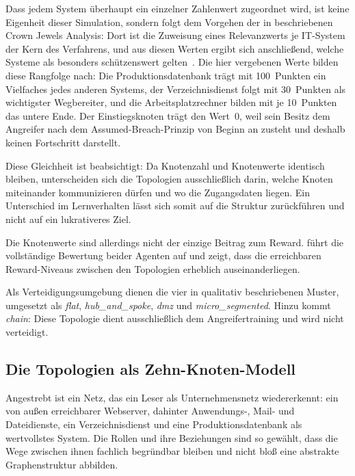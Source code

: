 Dass jedem System überhaupt ein einzelner Zahlenwert zugeordnet wird, ist keine
Eigenheit dieser Simulation, sondern folgt dem Vorgehen der in
 beschriebenen Crown Jewels Analysis: Dort ist
die Zuweisung eines Relevanzwerts je IT-System der Kern des Verfahrens, und aus
diesen Werten ergibt sich anschließend, welche Systeme als besonders
schützenswert gelten~\cite[Abschn.~II.A]{gangupantulu2021cja}. Die hier
vergebenen Werte bilden diese Rangfolge nach: Die Produktionsdatenbank trägt
mit 100~Punkten ein Vielfaches jedes anderen Systems, der Verzeichnisdienst
folgt mit 30~Punkten als wichtigster Wegbereiter, und die Arbeitsplatzrechner
bilden mit je 10~Punkten das untere Ende. Der Einstiegsknoten trägt den
Wert~0, weil sein Besitz dem Angreifer nach dem Assumed-Breach-Prinzip von
Beginn an zusteht und deshalb keinen Fortschritt darstellt.

Diese Gleichheit ist beabsichtigt: Da Knotenzahl und Knotenwerte identisch
bleiben, unterscheiden sich die Topologien ausschließlich darin, welche Knoten
miteinander kommunizieren dürfen und wo die Zugangsdaten liegen. Ein
Unterschied im Lernverhalten lässt sich somit auf die Struktur zurückführen und
nicht auf ein lukrativeres Ziel.

Die Knotenwerte sind allerdings nicht der einzige Beitrag zum Reward.
 führt die vollständige Bewertung beider Agenten auf und
zeigt, dass die erreichbaren Reward-Niveaus zwischen den Topologien erheblich
auseinanderliegen.

Als Verteidigungsumgebung dienen die vier in 
qualitativ beschriebenen Muster, umgesetzt als \emph{flat},
\emph{hub\_and\_spoke}, \emph{dmz} und \emph{micro\_segmented}. Hinzu kommt
\emph{chain}: Diese Topologie dient ausschließlich dem Angreifertraining und
wird nicht verteidigt.

\subsection{Die Topologien als Zehn-Knoten-Modell}
\label{sec:topomodell}

Angestrebt ist ein Netz, das ein Leser als Unternehmensnetz wiedererkennt: ein
von außen erreichbarer Webserver, dahinter Anwendungs-, Mail- und
Dateidienste, ein Verzeichnisdienst und eine Produktionsdatenbank als
wertvollstes System. Die Rollen und ihre Beziehungen sind so gewählt, dass die
Wege zwischen ihnen fachlich begründbar bleiben und nicht bloß eine abstrakte
Graphenstruktur abbilden.

